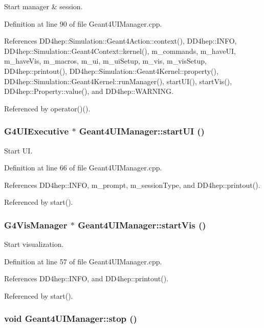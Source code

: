 Start manager \& session. 

Definition at line 90 of file Geant4UIManager.cpp.

References DD4hep::Simulation::Geant4Action::context(), DD4hep::INFO, DD4hep::Simulation::Geant4Context::kernel(), m\_\-commands, m\_\-haveUI, m\_\-haveVis, m\_\-macros, m\_\-ui, m\_\-uiSetup, m\_\-vis, m\_\-visSetup, DD4hep::printout(), DD4hep::Simulation::Geant4Kernel::property(), DD4hep::Simulation::Geant4Kernel::runManager(), startUI(), startVis(), DD4hep::Property::value(), and DD4hep::WARNING.

Referenced by operator()().\hypertarget{class_d_d4hep_1_1_simulation_1_1_geant4_u_i_manager_a9992d662309b9d5bcd67fba232801738}{
\subsubsection[{startUI}]{\setlength{\rightskip}{0pt plus 5cm}G4UIExecutive $\ast$ Geant4UIManager::startUI ()}}
\label{class_d_d4hep_1_1_simulation_1_1_geant4_u_i_manager_a9992d662309b9d5bcd67fba232801738}


Start UI. 

Definition at line 66 of file Geant4UIManager.cpp.

References DD4hep::INFO, m\_\-prompt, m\_\-sessionType, and DD4hep::printout().

Referenced by start().\hypertarget{class_d_d4hep_1_1_simulation_1_1_geant4_u_i_manager_a70ee5c55162faf4f3b77843449c8e799}{
\subsubsection[{startVis}]{\setlength{\rightskip}{0pt plus 5cm}G4VisManager $\ast$ Geant4UIManager::startVis ()}}
\label{class_d_d4hep_1_1_simulation_1_1_geant4_u_i_manager_a70ee5c55162faf4f3b77843449c8e799}


Start visualization. 

Definition at line 57 of file Geant4UIManager.cpp.

References DD4hep::INFO, and DD4hep::printout().

Referenced by start().\hypertarget{class_d_d4hep_1_1_simulation_1_1_geant4_u_i_manager_ab6f7bb12343b10b7d5ea19a422ad9718}{
\subsubsection[{stop}]{\setlength{\rightskip}{0pt plus 5cm}void Geant4UIManager::stop ()}}
\label{class_d_d4hep_1_1_simulation_1_1_geant4_u_i_manager_ab6f7bb12343b10b7d5ea19a422ad9718}


